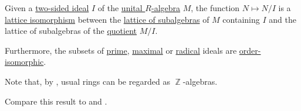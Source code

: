 \begin{theorem}\label{thm:quotient_ideal_lattice_theorem}
  Given a \hyperref[def:semiring_ideal]{two-sided ideal} \( I \) of the \hyperref[def:algebra_over_ring]{unital \( R \)-algebra} \( M \), the function \( N \mapsto N / I \) is a \hyperref[def:semilattice/homomorphism]{lattice isomorphism} between the \hyperref[thm:substructures_form_complete_lattice]{lattice of subalgebras} of \( M \) containing \( I \) and the lattice of subalgebras of the \hyperref[def:ring/quotient]{quotient} \( M / I \).

  Furthermore, the subsets of \hyperref[def:semiring_ideal/prime]{prime}, \hyperref[def:semiring_ideal/maximal]{maximal} or \hyperref[def:radical_ideal]{radical} ideals are \hyperref[def:partially_ordered_set/homomorphism]{order-isomorphic}.

  Note that, by , usual rings can be regarded as \( \BbbZ \)-algebras.

  Compare this result to  and .
\end{theorem}
